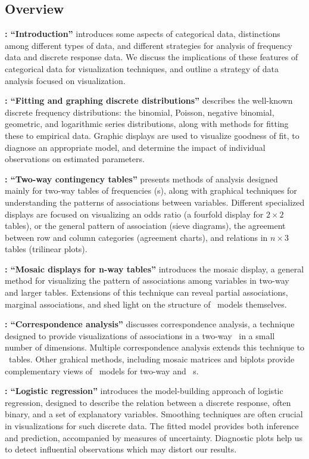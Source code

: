 \subsection*{Overview}
\textbf{: ``Introduction''} introduces some aspects of categorical data,
distinctions among different types of data, and different strategies
for analysis of frequency data and discrete response data.  We
discuss the implications of these features of categorical data for
visualization techniques, and outline a strategy of data analysis
focused on visualization.

\textbf{: ``Fitting and graphing discrete distributions''} describes the well-known discrete
frequency distributions: the binomial, Poisson, negative binomial,
geometric, and logarithmic series distributions,
along with methods for fitting these to empirical data.
Graphic displays are used to visualize goodness of fit,
to diagnose an appropriate model, and determine the impact of
individual observations on estimated parameters.


\textbf{: ``Two-way contingency tables''} presents methods of analysis designed
mainly for two-way tables of frequencies (\ctab{}s), along with
graphical techniques for understanding the patterns of associations
between variables.
Different specialized displays are focused
on visualizing an odds ratio (a fourfold display for
$2 \times 2$ tables), or the general
pattern of association
(sieve diagrams),  the agreement between row and column
categories (agreement charts), and relations in $n \times 3$ tables
(trilinear plots).

\textbf{: ``Mosaic displays for n-way tables''} introduces the mosaic display, a general method
for visualizing the pattern of associations
among variables in two-way and larger tables.
Extensions of
this technique can reveal partial associations, marginal associations,
and shed light on the structure of \loglin\ models themselves. 
 
\textbf{: ``Correspondence analysis''} discusses
correspondence analysis, a technique designed to
provide visualizations of associations in a two-way \ctab\
in a small number of dimensions.
Multiple correspondence analysis extends this technique to \nway\
tables.  Other grahical methods, including mosaic matrices and biplots
provide complementary views of \loglin\ models for two-way and \nway\
\ctab{}s.

\textbf{\chref{ch:logistic}: ``Logistic regression''}
introduces the model-building approach of
logistic regression, designed to describe the relation between 
a discrete response, often binary, and a set of explanatory variables.
Smoothing techniques are often crucial in visualizations for such
discrete data.  The fitted model provides both inference and
prediction, accompanied by measures of uncertainty.  Diagnostic
plots help us to detect influential observations which may distort
our results.

